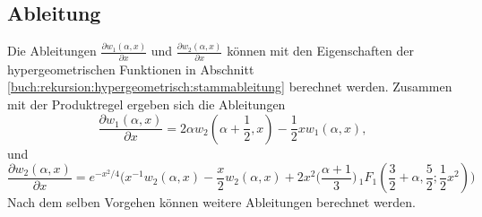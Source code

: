 \subsection{Ableitung}
Die Ableitungen $\frac{\partial w_1(\alpha, x)}{\partial x}$ und
$\frac{\partial w_2(\alpha, x)}{\partial x}$ 
können mit den Eigenschaften der hypergeometrischen Funktionen in Abschnitt 
\ref{buch:rekursion:hypergeometrisch:stammableitung} berechnet werden. 
Zusammen mit der Produktregel ergeben sich die Ableitungen
\begin{equation}
	\frac{\partial w_1(\alpha,x)}{\partial x}
	=
	2\alpha w_2(\alpha + {\textstyle\frac{1}{2}}, x) - \frac{1}{2} x w_1(\alpha, x),
\end{equation} 
und
\begin{equation}
	\frac{\partial w_2(\alpha,x)}{\partial x}
	=
	e^{-x^2/4} \biggl(
	x^{-1} w_2(\alpha, x) - \frac{x}{2} w_2(\alpha, x)
	+
	2 x^2 \biggl(\frac{\alpha + 1}{3}\biggr)
	\,
	{}_{1} F_{1} (
	{\textstyle \frac{3}{2}} 
	+ \alpha, {\textstyle \frac{5}{2}} ; {\textstyle \frac{1}{2}}x^2)
	\biggr)
\end{equation}
Nach dem selben Vorgehen können weitere Ableitungen berechnet werden.


